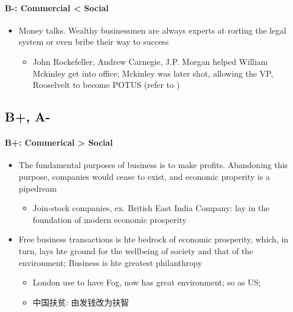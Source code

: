 \documentclass{article}
\begin{document}
      \paragraph{B-: Commercial < Social}
      \begin{itemize}
        \item Money talks. Wealthy businessmen are always experts at rorting
        the legal system or even bribe their way to success
        \begin{itemize}
          \item John Rockefeller, Andrew Carnegie, J.P. Morgan helped
          William Mckinley get into office; Mckinley was later shot, allowing
          the VP, Rooselvelt to become POTUS (refer to
          )
        \end{itemize}
      \end{itemize}

    \subsection{B+, A-}

      \paragraph{B+: Commerical > Social}
      \begin{itemize}
        \item The fundamental purposes of business is to make profits.
        Abandoning this purpose, companies would cease to exist, and economic
        properity is a pipedream
        \begin{itemize}
          \item Join-stock companies, ex. British East India Company: lay in
          the foundation of modern economic prosperity
        \end{itemize}

        \item Free business transactions is hte bedrock of economic prosperity,
        which, in turn, lays hte ground for the wellbeing of society and that
        of the environment; Business is hte greatest philanthropy
        \begin{itemize}
          \item London use to have Fog, now has great environment; so as US;
          \item 中国扶贫: 由发钱改为扶智
        \end{itemize}
      \end{itemize}
\end{document}
